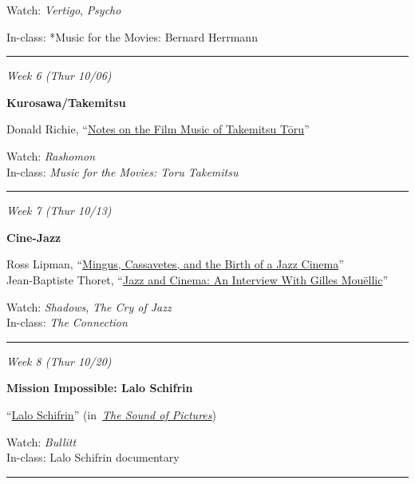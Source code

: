 \documentclass[]{tufte-handout}
\begin{document}
Watch: \emph{Vertigo}, \emph{Psycho}

In-class: *Music for the Movies: Bernard Herrmann

\begin{center}\rule{0.5\linewidth}{0.5pt}\end{center}

\emph{Week 6 (Thur 10/06)}

\textbf{Kurosawa/Takemitsu}

Donald Richie,
``\href{https://canvas.emerson.edu/courses/1622820/files/92619118/download?wrap=1}{Notes
on the Film Music of Takemitsu Tōru}''

Watch: \emph{Rashomon}\\
In-class: \emph{Music for the Movies: Toru Takemitsu}

\begin{center}\rule{0.5\linewidth}{0.5pt}\end{center}

\emph{Week 7 (Thur 10/13)}

\textbf{Cine-Jazz}

Ross Lipman,
``\href{https://canvas.emerson.edu/courses/1622820/files/92558319/download?wrap=1}{Mingus,
Cassavetes, and the Birth of a Jazz Cinema}''\\
Jean-Baptiste Thoret,
``\href{http://www.screeningthepast.com/2013/06/jazz-and-cinema-an-interview-with-gilles-mouellic/}{Jazz
and Cinema: An Interview With Gilles Mouëllic}''

Watch: \emph{Shadows}, \emph{The Cry of Jazz}\\
In-class: \emph{The Connection}

\begin{center}\rule{0.5\linewidth}{0.5pt}\end{center}

\emph{Week 8 (Thur 10/20)}

\textbf{Mission Impossible: Lalo Schifrin}

``\href{https://canvas.emerson.edu/courses/1622820/files/93569047/download?wrap=1}{Lalo
Schifrin}''
(in~\href{https://ebookcentral.proquest.com/lib/emerson/detail.action?docID=1887549\#}{\emph{The
Sound of Pictures}})~

Watch: \emph{Bullitt}\\
In-class: Lalo Schifrin documentary

\begin{center}\rule{0.5\linewidth}{0.5pt}\end{center}
\end{document}
